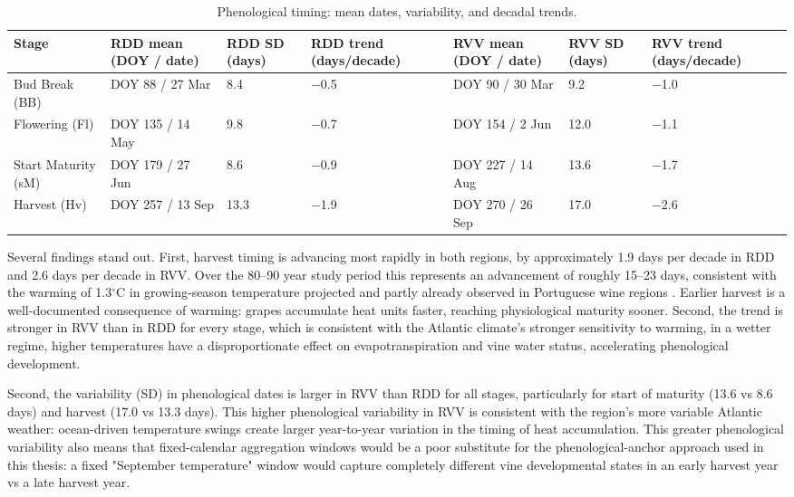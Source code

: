 \begin{table}[htbp]
  \centering
  \caption{Phenological timing: mean dates, variability, and decadal trends.}\label{tab:appb_3}
  \footnotesize
  \begin{adjustbox}{max width=\textwidth}
    \begin{tabularx}{\textwidth}{p{2.2cm}|p{2cm}|p{1.4cm}|p{1.9cm}|p{2cm}|p{1.4cm}|X}
  \toprule
  Stage & RDD mean
(DOY / date) & RDD SD
(days) & RDD trend
(days/decade) & RVV mean
(DOY / date) & RVV SD
(days) & RVV trend
(days/decade) \\
  \midrule
  Bud Break (BB) & DOY 88 / 27 Mar & 8.4 & $-$0.5 & DOY 90 / 30 Mar & 9.2 & $-$1.0 \\
  Flowering (Fl) & DOY 135 / 14 May & 9.8 & $-$0.7 & DOY 154 / 2 Jun & 12.0 & $-$1.1 \\
  Start Maturity (sM) & DOY 179 / 27 Jun & 8.6 & $-$0.9 & DOY 227 / 14 Aug & 13.6 & $-$1.7 \\
  Harvest (Hv) & DOY 257 / 13 Sep & 13.3 & $-$1.9 & DOY 270 / 26 Sep & 17.0 & $-$2.6 \\
  \bottomrule
  \end{tabularx}
  \end{adjustbox}

\end{table}


Several findings stand out. First, harvest timing is advancing most rapidly in both regions, by approximately 1.9 days per decade in RDD and 2.6 days per decade in RVV. Over the 80--90 year study period this represents an advancement of roughly 15--23 days, consistent with the warming of 1.3$^\circ$C in growing-season temperature projected and partly already observed in Portuguese wine regions \citep{Cunha2016}. Earlier harvest is a well-documented consequence of warming: grapes accumulate heat units faster, reaching physiological maturity sooner. Second, the trend is stronger in RVV than in RDD for every stage, which is consistent with the Atlantic climate's stronger sensitivity to warming, in a wetter regime, higher temperatures have a disproportionate effect on evapotranspiration and vine water status, accelerating phenological development.

Second, the variability (SD) in phenological dates is larger in RVV than RDD for all stages, particularly for start of maturity (13.6 vs 8.6 days) and harvest (17.0 vs 13.3 days). This higher phenological variability in RVV is consistent with the region's more variable Atlantic weather: ocean-driven temperature swings create larger year-to-year variation in the timing of heat accumulation. This greater phenological variability also means that fixed-calendar aggregation windows would be a poor substitute for the phenological-anchor approach used in this thesis: a fixed "September temperature" window would capture completely different vine developmental states in an early harvest year vs a late harvest year.


